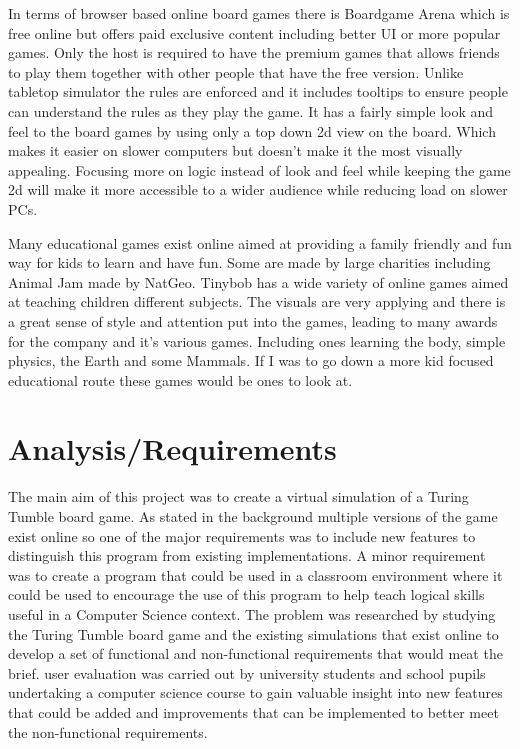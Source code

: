\documentclass{l4proj}
\begin{document}
In terms of browser based online board games there is Boardgame Arena which is free online but offers paid exclusive content including better UI or more popular
games. Only the host is required to have the premium games that allows friends to play them together with other people that have the free version. Unlike tabletop simulator
the rules are enforced and it includes tooltips to ensure people can understand the rules as they play the game. It has a fairly simple look and feel to the board games
by using only a top down 2d view on the board. Which makes it easier on slower computers but doesn't make it the most visually appealing. 
Focusing more on logic instead of look and feel while keeping the game 2d will make it more accessible to a wider audience while reducing load on slower PCs.

Many educational games exist online aimed at providing a family friendly and fun way for kids to learn and have fun. Some are made by large charities including Animal Jam made by NatGeo. 
Tinybob has a wide variety of online games aimed at teaching children different subjects. The visuals are very applying and there is a great sense of style and attention put into the games, leading to many awards for the company 
and it's various games. Including ones learning the body, simple physics, the Earth and some Mammals. If I was to go down a more kid focused educational route
these games would be ones to look at.

\chapter{Analysis/Requirements}




The main aim of this project was to create a virtual simulation of a Turing Tumble board game. As stated in the background multiple versions of the game exist online so one of the major requirements was to include new features to distinguish this program from existing implementations. A minor requirement was to create a program that could be used in a classroom environment where it could be used to encourage the use of this program to help teach logical skills useful in a Computer Science context. The problem was researched by studying the Turing Tumble board game and the existing simulations that exist online to develop a set of functional and non-functional requirements that would meat the brief. user evaluation was carried out by university students and school pupils undertaking a computer science course to gain valuable insight into new features that could be added and improvements that can be implemented to better meet the non-functional requirements.
\end{document}
